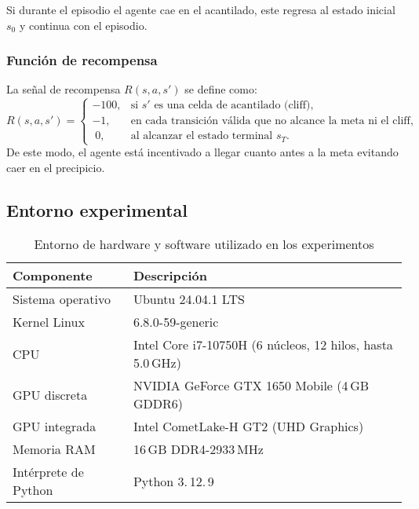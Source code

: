 Si durante el episodio el agente cae en el acantilado, este regresa al estado inicial $s_0$ y continua con el episodio.

\subsubsection{Función de recompensa}
La señal de recompensa $R(s,a,s')$ se define como:
\[
  R(s,a,s') = 
  \begin{cases}
    -100, & \text{si } s' \text{ es una celda de acantilado (cliff),}\\
    -1,   & \text{en cada transición válida que no alcance la meta ni el cliff,}\\
    \;0,  & \text{al alcanzar el estado terminal } s_T.
  \end{cases}
\]
De este modo, el agente está incentivado a llegar cuanto antes a la meta evitando caer en el precipicio.


\subsection{Entorno experimental}

\begin{table}[H]
  \centering
  \begin{tabular}{@{} ll @{}}
    \toprule
    \textbf{Componente} & \textbf{Descripción} \\
    \midrule
    Sistema operativo      & Ubuntu 24.04.1 LTS \\
    Kernel Linux           & 6.8.0-59-generic \\
    CPU                    & Intel Core i7-10750H (6 núcleos, 12 hilos, hasta 5.0\,GHz) \\
    GPU discreta           & NVIDIA GeForce GTX 1650 Mobile (4\,GB GDDR6) \\
    GPU integrada          & Intel CometLake-H GT2 (UHD Graphics) \\
    Memoria RAM            & 16\,GB DDR4-2933\,MHz \\
    Intérprete de Python   & Python 3.\,12.\,9\quad \\
    \bottomrule
  \end{tabular}
  \caption{Entorno de hardware y software utilizado en los experimentos}
  \label{tab:entorno-experimental}
\end{table}